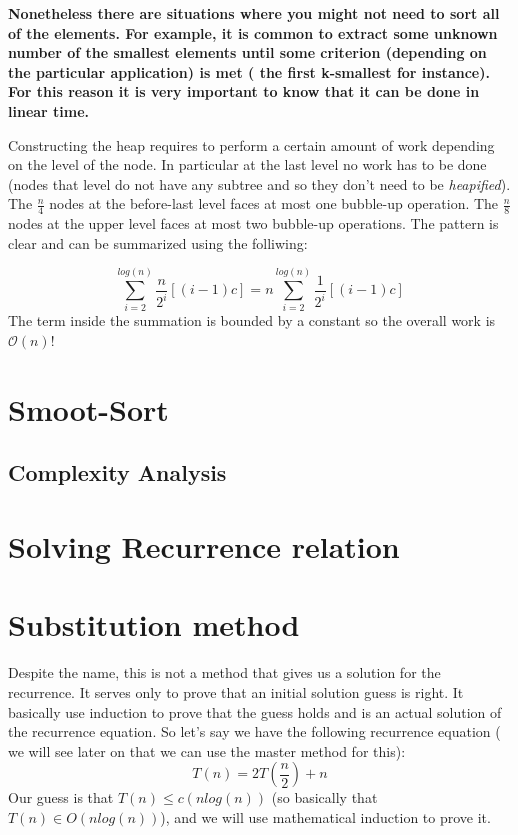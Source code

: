 \begin{framed}
\textbf{Nonetheless there are situations where you might not need to sort all of the elements. For example, it is common to extract some unknown number of the smallest elements until some criterion (depending
on the particular application) is met ( the first k-smallest for instance). For this reason it is very important to know  that it can be done in linear time.}

Constructing the heap requires to perform a certain amount of work depending on the level of the node. In particular at the last level no work has to be done (nodes  that level do not have any subtree and so they don't need to be \textit{heapified}).
The $\frac{n}{4}$ nodes at the before-last level faces at most one bubble-up operation.
The $\frac{n}{8}$ nodes at the upper level faces at most two bubble-up operations. The pattern is clear and can be summarized using the folliwing:

\[
\sum_{i=2}^{log(n)} \frac{n}{2^{i}}[(i-1)c] = n \sum_{i=2}^{log(n)} \frac{1}{2^{i}}[(i-1)c]
\]
The term inside the summation is bounded by a constant so the overall work is $\mathcal{O}(n)$!
\end{framed}



\section{Smoot-Sort}

\subsection{Complexity Analysis}


\section{Solving Recurrence relation}

\section{Substitution method}
\label{sec:substitutionmethod}
Despite the name, this is not a method that gives us a solution for the recurrence. It serves only to prove that an initial solution guess is right. It basically use induction to prove that the guess holds and is an actual solution of the recurrence equation.
So let's say we have the following recurrence equation ( we will see later on that we can use the master method for this):
\[T(n) = 2T(\frac{n}{2}) + n\]
Our guess is that $T(n) \leq c(nlog(n))$ (so basically that $T(n) \in O(nlog(n))$), and we will use mathematical induction to prove it.

